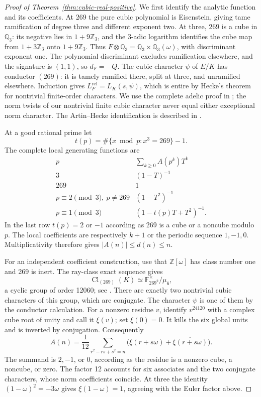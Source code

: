 \documentclass[11pt]{article}
\theoremstyle{remark}\newtheorem{remark}[theorem]{Remark}
\begin{document}
\begin{proof}[Proof of Theorem~\ref{thm:cubic-real-positive}]
We first identify the analytic function and its coefficients.
At 269 the pure cubic polynomial is Eisenstein, giving tame ramification of degree three and different exponent two.
At three, $269$ is a cube in $\mathbb Q_3$: its negative lies in $1+9\mathbb Z_3$, and the $3$-adic logarithm identifies the cube map from $1+3\mathbb Z_3$ onto $1+9\mathbb Z_3$.
Thus $F\otimes\mathbb Q_3=\mathbb Q_3\times\mathbb Q_3(\omega)$, with discriminant exponent one.
The polynomial discriminant excludes ramification elsewhere, and the signature is $(1,1)$, so $d_F=-Q$.
The cubic character $\psi$ of $E/K$ has conductor $(269)$: it is tamely ramified there, split at three, and unramified elsewhere.
Induction gives $L_F^{\mathrm{rel}}=L_K(s,\psi)$, which is entire by Hecke's theorem for nontrivial finite-order characters. We use the complete adelic proof in \citet[Theorems~5.16 and~5.22, pp.~34--39]{Poonen2015}; the norm twists of our nontrivial finite cubic character never equal either exceptional norm character. The Artin--Hecke identification is described in \citet[Chapter~VIII, Section~10]{Milne2020}.

At a good rational prime let
\[
 t(p)=\#\{x\bmod p:x^3=269\}-1.
\]
The complete local generating functions are
\[
\begin{array}{c|c}
p&\displaystyle\sum_{k\ge0}A(p^k)T^k\\\hline
3&(1-T)^{-1}\\
269&1\\
p\equiv2\pmod3,\ p\ne269&(1-T^2)^{-1}\\
p\equiv1\pmod3&(1-t(p)T+T^2)^{-1}.
\end{array}
\]
In the last row $t(p)=2$ or $-1$ according as 269 is a cube or a noncube modulo $p$.
The local coefficients are respectively $k+1$ or the periodic sequence $1,-1,0$.
Multiplicativity therefore gives $|A(n)|\le d(n)\le n$.

For an independent coefficient construction, use that $\mathbb Z[\omega]$ has class number one and 269 is inert.
The ray-class exact sequence gives
\[
 \operatorname{Cl}_{(269)}(K)
   \simeq\mathbb F_{269^2}^{\times}/\mu_6,
\]
a cyclic group of order 12060; see \citet[Chapter~V, Section~1]{Milne2020}.
There are exactly two nontrivial cubic characters of this group, which are conjugate.
The character $\psi$ is one of them by the conductor calculation.
For a nonzero residue $v$, identify $v^{24120}$ with a complex cube root of unity and call it $\xi(v)$; set $\xi(0)=0$.
It kills the six global units and is inverted by conjugation.
Consequently
\[
 A(n)=\frac1{12}\sum_{r^2-rs+s^2=n}
   \bigl(\xi(r+s\omega)+\overline{\xi(r+s\omega)}\bigr).
\]
The summand is $2,-1$, or $0$, according as the residue is a nonzero cube, a noncube, or zero.
The factor 12 accounts for six associates and the two conjugate characters, whose norm coefficients coincide.
At three the identity $(1-\omega)^2=-3\omega$ gives $\xi(1-\omega)=1$, agreeing with the Euler factor above.


\end{proof}
\end{document}
